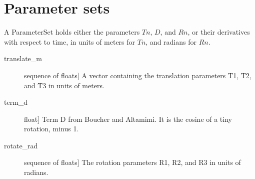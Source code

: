 \documentclass[a4paper,10pt,english]{sphinxmanual}
\begin{document}
\section{Parameter sets}
\label{\detokenize{api-docs:module-etrsitrs.parameterset}}\label{\detokenize{api-docs:parameter-sets}}

\begin{fulllineitems}
\label{\detokenize{api-docs:etrsitrs.parameterset.ParameterSet}}
A ParameterSet holds either the parameters \(Tn\), \(D\),
and \(Rn\), or their derivatives with respect to time, in
units of meters for \(Tn\), and radians for \(Rn\).

\begin{description}
\item[{translate\_m}] \leavevmode{[}sequence of floats{]}
A vector containing the translation parameters T1, T2, and T3
in units of meters.

\item[{term\_d}] \leavevmode{[}float{]}
Term D from Boucher and Altamimi. It is the cosine of
a tiny rotation, minus 1.

\item[{rotate\_rad}] \leavevmode{[}sequence of floats{]}
The rotation parameters R1, R2, and R3 in units of radians.

\end{description}



\end{fulllineitems}
\end{document}
